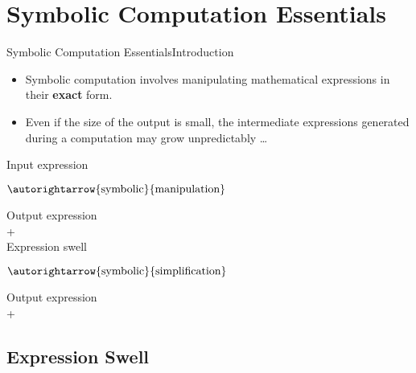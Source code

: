 
\section{Symbolic Computation Essentials}

\begin{frame}{Symbolic Computation Essentials}{Introduction}
  \begin{itemize}
    \item Symbolic computation involves manipulating mathematical expressions in their \textbf{exact} form.
    \item Even if the size of the output is small, the intermediate expressions generated during a computation may grow unpredictably \dots
  \end{itemize}
  \begin{center}\begin{minipage}{\textwidth}\begin{bbox}
    \centering%
    \begin{minipage}[c]{0.15\textwidth} \centering Input expression \end{minipage}%
    \begin{minipage}[c]{0.19\textwidth} \centering $\autorightarrow{\text{symbolic}}{\text{manipulation}}$ \end{minipage}%
    \begin{minipage}[c]{0.21\textwidth} \centering Output expression \\ + \\ Expression swell \end{minipage}%
    \begin{minipage}[c]{0.19\textwidth} \centering $\autorightarrow{\text{symbolic}}{\text{simplification}}$ \end{minipage}%
    \begin{minipage}[c]{0.21\textwidth} \centering Output expression \\ + \\  \end{minipage}%
  \end{bbox}\end{minipage}\end{center}
\end{frame}

\subsection{Expression Swell}

